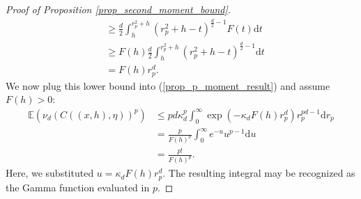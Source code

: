 \documentclass{article}
\newcommand{\EE}{\mathbb{E}}
\theoremstyle{plain}
\theoremstyle{remark}
\theoremstyle{definition}
\begin{document}
\begin{proof}[Proof of Proposition \ref{prop_second_moment_bound}]
\begin{align}
        &\geq \frac{d}{2}\int_h^{r_p^2 + h}\left(r_p^2 + h -t \right)^{\frac{d}{2}-1}F(t)\mathrm{d}t \nonumber\\
        &\geq F(h)\frac{d}{2}\int_h^{r_p^2 + h}\left(r_p^2 + h -t \right)^{\frac{d}{2}-1}\mathrm{d}t\nonumber \\
        &= F(h)r_p^d. \label{lower_bound_fractional_integral}
    \end{align}
    We now plug this lower bound into (\ref{prop_p_moment_result}) and assume $F(h) > 0$:
    \begin{align*}
        \EE\left(\nu_d(C((x,h),\eta))^p\right) &\leq pd\kappa_d^p\int_0^\infty \exp\left(-\kappa_dF(h)r_p^d\right)r_p^{pd-1}\mathrm{d}r_p\\
        &= \frac{p}{F(h)^p}\int_0^\infty e^{-u}u^{p-1}\mathrm{d}u\\ &= \frac{p!}{F(h)^p}.
    \end{align*}
    Here, we substituted $u = \kappa_d F(h)r_p^d$. The resulting integral may be recognized as the Gamma function evaluated in $p$.
\end{proof}
\end{document}
